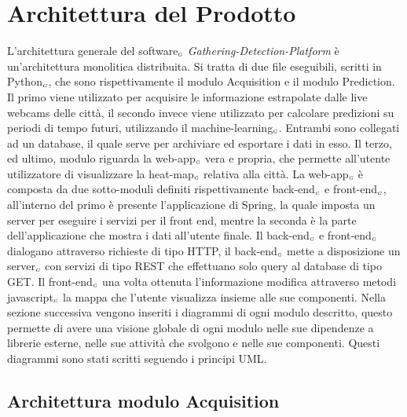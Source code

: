 \chapter{Architettura del Prodotto}\label{ArchitetturaDelProdotto}
L'architettura generale del software$_{\scaleto{G}{3pt}}$ \textit{Gathering-Detection-Platform} è un'architettura monolitica distribuita.
Si tratta di due file eseguibili, scritti in Python$_{\scaleto{G}{3pt}}$, che sono rispettivamente il modulo Acquisition e il modulo Prediction.
Il primo viene utilizzato per acquisire le informazione estrapolate dalle live webcams delle città, il secondo invece viene utilizzato per calcolare predizioni su periodi di tempo futuri, utilizzando il machine-learning$_{\scaleto{G}{3pt}}$.
Entrambi sono collegati ad un database, il quale serve per archiviare ed esportare i dati in esso.
Il terzo, ed ultimo, modulo riguarda la web-app$_{\scaleto{G}{3pt}}$ vera e propria, che permette all'utente utilizzatore di visualizzare la heat-map$_{\scaleto{G}{3pt}}$ relativa alla città.
La web-app$_{\scaleto{G}{3pt}}$ è composta da due sotto-moduli definiti rispettivamente back-end$_{\scaleto{G}{3pt}}$ e front-end$_{\scaleto{G}{3pt}}$, all'interno del primo è presente l'applicazione di Spring, la quale imposta un server per eseguire i servizi per il front end, mentre la seconda è la parte dell'applicazione che mostra i dati all'utente finale. Il back-end$_{\scaleto{G}{3pt}}$ e front-end$_{\scaleto{G}{3pt}}$ dialogano attraverso richieste di tipo HTTP, il back-end$_{\scaleto{G}{3pt}}$ mette a disposizione un server$_{\scaleto{G}{3pt}}$ con servizi di tipo REST che effettuano solo query al database di tipo GET. Il front-end$_{\scaleto{G}{3pt}}$ una volta ottenuta l'informazione modifica attraverso metodi javascript$_{\scaleto{G}{3pt}}$ la mappa che l'utente visualizza insieme alle sue componenti.
Nella sezione successiva vengono inseriti i diagrammi di ogni modulo descritto, questo permette di avere una visione globale di ogni modulo nelle sue dipendenze a librerie esterne, nelle sue attività che svolgono e nelle sue componenti. Questi diagrammi sono stati scritti seguendo i principi UML.

\section{Architettura modulo Acquisition}
